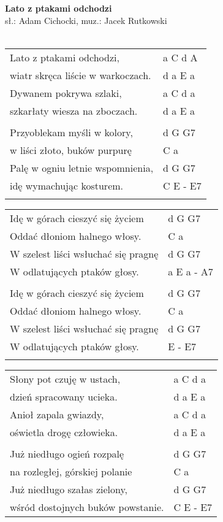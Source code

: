 \documentclass[a5paper]{article}
\begin{document}


\noindent
\fontsize{12pt}{15pt}\selectfont
\textbf{Lato z ptakami odchodzi} \\
\fontsize{8pt}{10pt}\selectfont
sł.: Adam Cichocki, muz.: Jacek Rutkowski \\ \\
\fontsize{10pt}{12pt}\selectfont
{}
\begin{tabular}{@{}p{8cm}p{3cm}@{}}
\noindent
Lato z ptakami odchodzi, & a C d A \\
wiatr skręca liście w warkoczach. & d a E a \\
Dywanem pokrywa szlaki, & a C d a \\
szkarłaty wiesza na zboczach. & d a E a \\ \\
Przyoblekam myśli  w kolory, & d G G7 \\
w liści złoto, buków purpurę & C a \\
Palę w ogniu letnie wspomnienia, & d G G7 \\
idę wymachując kosturem. & C E - E7 \\ \\
\end{tabular}

\noindent
\begin{tabular}{@{}p{7cm}p{3cm}@{}} 
Idę w górach cieszyć się życiem & d G G7 \\
Oddać dłoniom halnego włosy. & C a \\
W szelest liści wsłuchać się pragnę & d G G7 \\ 
W odlatujących ptaków głosy. & a E a - A7 \\ \\
Idę w górach cieszyć się życiem & d G G7 \\ 
Oddać dłoniom halnego włosy. & C a \\
W szelest liści wsłuchać się pragnę & d G G7 \\
W odlatujących ptaków głosy. & E - E7 \\ \\
\end{tabular}

\noindent
\begin{tabular}{@{}p{8cm}p{3cm}@{}}
Słony pot czuję w ustach, & a C d a \\
dzień spracowany ucieka. & d a E a \\
Anioł zapala gwiazdy, & a C d a \\
oświetla drogę człowieka. & d a E a \\ \\
Już niedługo ogień rozpalę & d G G7 \\
na rozległej, górskiej polanie & C a \\
Już niedługo szałas zielony, & d G G7 \\
wśród dostojnych buków powstanie. & C E - E7
\end{tabular}
\end{document}
